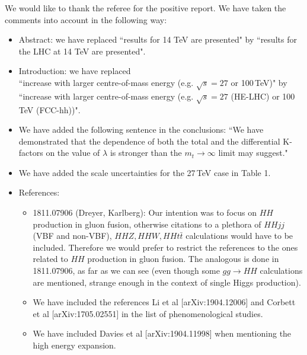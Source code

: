 \documentclass[]{article}
\begin{document}
We would like to thank the referee for the positive report.
We have taken the comments into account in the following way:

\begin{itemize}
\item  Abstract: we have replaced ``results for 14 TeV are presented" by ``results for the LHC at 14 TeV are presented".

\item Introduction: we have replaced\\
 ``increase with larger centre-of-mass energy (e.g. $\sqrt{s}=27$ or
 100\,TeV)" by \\
``increase with larger centre-of-mass energy (e.g. $\sqrt{s}=27$ (HE-LHC) or 100\,TeV (FCC-hh))".

\item We have added the following sentence in the conclusions:
``We have demonstrated that the dependence of both the total and the
differential K-factors on the value of $\lambda$ is stronger than the $m_t\to\infty$ limit may suggest."

\item We have added the scale uncertainties for the 27\,TeV case in Table 1.



\item References: 
\begin{itemize}
\item
1811.07906 (Dreyer, Karlberg): 
Our intention was to focus on $HH$ production in gluon fusion, otherwise citations to a plethora of
$HHjj$ (VBF and non-VBF), $HHZ,HHW, HHt\bar{t}$ calculations would have to be included.  
Therefore we would prefer to restrict the references to the ones
related to $HH$ production in gluon fusion.
The analogous is done in 1811.07906, as far as we can see (even though
some $gg\to HH$ calculations are mentioned, strange enough in the context of
single Higgs production). 

\item We have included the references Li et al [arXiv:1904.12006] and Corbett et al [arXiv:1705.02551] in the list of phenomenological studies.

\item We have included Davies et al [arXiv:1904.11998] when mentioning the high energy expansion.

\end{itemize}
\end{itemize}
\end{document}
